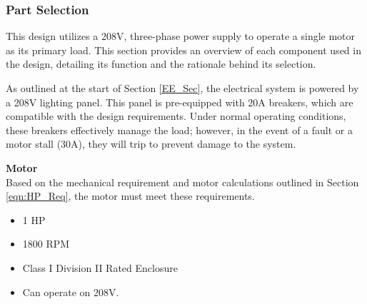 \documentclass[10pt]{project}
\begin{document}
\newpage

\subsubsection{Part Selection}
This design utilizes a 208V, three-phase power supply to operate a single motor as its primary load. This section provides an overview of each component used in the design, detailing its function and the rationale behind its selection.

As outlined at the start of Section \ref{EE_Sec}, the electrical system is powered by a 208V lighting panel. This panel is pre-equipped with 20A breakers, which are compatible with the design requirements. Under normal operating conditions, these breakers effectively manage the load; however, in the event of a fault or a motor stall (30A), they will trip to prevent damage to the system.

\vspace{.2cm}

\textbf{Motor}\\
Based on the mechanical requirement and motor calculations outlined in Section \ref{eqn:HP_Req}, the motor must meet these requirements.

\begin{itemize}[noitemsep, topsep=0pt]
    \item 1 HP
    \item 1800 RPM
    \item Class I Division II Rated Enclosure
    \item Can operate on 208V.
\end{itemize}
\end{document}

